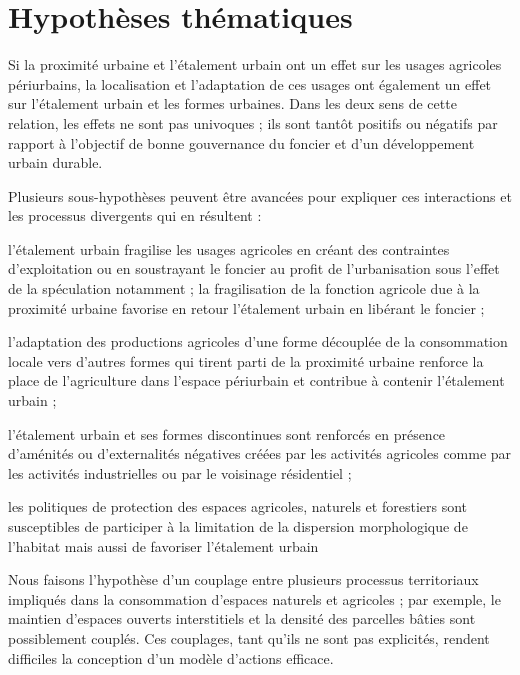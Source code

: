 \section{Hypothèses thématiques}

\startitemize[n]

\item	Si la proximité urbaine
	et l'étalement urbain ont un effet sur les usages agricoles
	périurbains, la localisation et l'adaptation de ces usages
	ont également un effet sur l'étalement urbain et les formes urbaines.
	Dans les deux sens de cette relation, les effets ne sont pas univoques ;
	ils sont tantôt positifs ou négatifs par rapport à l'objectif de bonne gouvernance
	du foncier et d'un développement urbain durable.

	Plusieurs sous-hypothèses peuvent être avancées
	pour expliquer ces interactions et les processus divergents
	qui en résultent :

	\startitemize[a,packed]

	\item	l'étalement urbain fragilise les usages agricoles
		en créant des contraintes d'exploitation ou
		en soustrayant le foncier au profit de l'urbanisation
		sous l'effet de la spéculation notamment ;
		la fragilisation de la fonction agricole
		due à la proximité urbaine favorise en retour l'étalement urbain
		en libérant le foncier ;

	\item	l'adaptation des productions agricoles d'une forme
		découplée de la consommation locale vers d'autres
		formes qui tirent parti de la proximité urbaine
		renforce la place de l'agriculture dans l'espace périurbain
		et contribue à contenir l'étalement urbain ;

	\item	l'étalement urbain et ses formes discontinues sont renforcés
		en présence d'aménités ou d'externalités négatives créées par les activités
		agricoles comme par les activités industrielles
		ou par le voisinage résidentiel ;

	\item	les politiques de protection des espaces agricoles, naturels
		et forestiers sont susceptibles de participer
		à la limitation de la dispersion morphologique de l'habitat
		mais aussi de favoriser l'étalement urbain

	\stopitemize

\item	Nous faisons l'hypothèse d'un couplage entre plusieurs processus territoriaux
	impliqués dans la consommation d'espaces naturels et agricoles ;
	par exemple, le maintien d'espaces ouverts
	interstitiels et la densité des parcelles bâties sont possiblement couplés.
	Ces couplages, tant qu'ils ne sont pas explicités,
	rendent difficiles la conception d'un modèle d'actions efficace.

